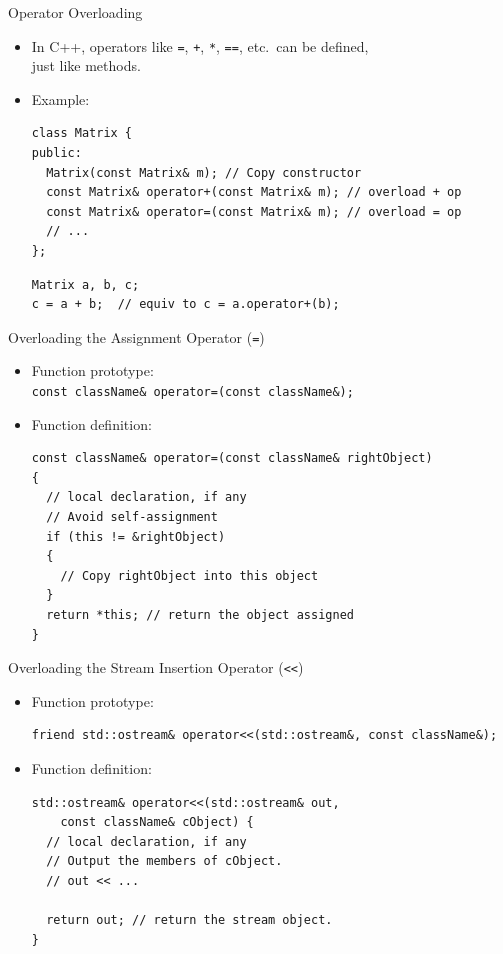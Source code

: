 \documentclass[14pt, aspectratio=1610, hyperref={pdfpagelayout=SinglePage}]{beamer}
\begin{document}
\begin{frame}[fragile]{Operator Overloading}
\begin{itemize}
\item In C++, operators like \texttt{=}, \texttt{+}, \texttt{*}, \texttt{==}, etc.\ can be defined,\\ just like methods.
\item Example:

\begin{lstlisting}[basicstyle=\ttfamily\footnotesize]
class Matrix {
public:
  Matrix(const Matrix& m); // Copy constructor
  const Matrix& operator+(const Matrix& m); // overload + op
  const Matrix& operator=(const Matrix& m); // overload = op
  // ...
};
\end{lstlisting}
\begin{lstlisting}[basicstyle=\ttfamily\footnotesize]
Matrix a, b, c;
c = a + b;  // equiv to c = a.operator+(b);
\end{lstlisting}
\end{itemize}
\end{frame}

\begin{frame}[fragile]{Overloading the Assignment Operator (\texttt{=})}
  \begin{itemize}
  \item
    Function prototype:\\
    \lstinline{const className& operator=(const className&);}
  \item
    Function definition:\\
    \begin{lstlisting}[basicstyle=\small\ttfamily]
const className& operator=(const className& rightObject)
{
  // local declaration, if any
  // Avoid self-assignment
  if (this != &rightObject)
  {
    // Copy rightObject into this object
  }
  return *this; // return the object assigned
}\end{lstlisting}
  \end{itemize}
\end{frame}

\begin{frame}[fragile]{Overloading the Stream Insertion Operator
  (\texttt{{<}<})}
  \protect\hypertarget{overloading-the-stream-insertion-operator}{}
  \begin{itemize}
  \item
    Function prototype:\\
\begin{lstlisting}
friend std::ostream& operator<<(std::ostream&, const className&);
\end{lstlisting}
  \item
    Function definition:\\
\begin{lstlisting}[basicstyle=\small\ttfamily]
std::ostream& operator<<(std::ostream& out,
    const className& cObject) {
  // local declaration, if any
  // Output the members of cObject.
  // out << ...

  return out; // return the stream object.
}\end{lstlisting}
  \end{itemize}
\end{frame}
\end{document}
